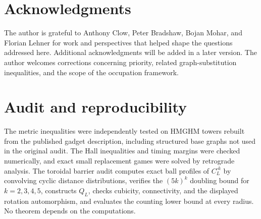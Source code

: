 \documentclass[11pt]{amsart}
\theoremstyle{definition}
\begin{document}
\section*{Acknowledgments}
The author is grateful to Anthony Clow, Peter Bradshaw, Bojan Mohar, and
Florian Lehner for work and perspectives that helped shape the questions
addressed here.  Additional acknowledgments will be added in a later version.
The author welcomes corrections concerning priority, related
graph-substitution inequalities, and the scope of the occupation framework.

\section*{Audit and reproducibility}

The metric inequalities were independently tested on HMGHM towers rebuilt
from the published gadget description, including structured base graphs not
used in the original audit.  The Hall inequalities and timing margins were
checked numerically, and exact small replacement games were solved by
retrograde analysis.  The toroidal barrier audit computes exact ball profiles of
$C_L^{\square k}$ by convolving cyclic distance distributions, verifies the
$(5k)^k$ doubling bound for $k=2,3,4,5$, constructs $Q_L$, checks cubicity,
connectivity, and the displayed rotation automorphism, and evaluates the
counting lower bound at every radius.  No theorem depends on the
computations.
\end{document}
